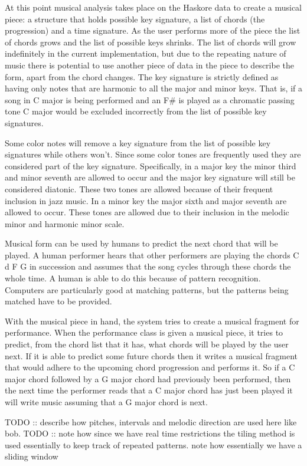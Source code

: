 \documentclass[12pt]{ucthesis}
\begin{document}
{At this point musical analysis takes place on the Haskore data to create a musical piece: a structure that holds possible key signature, a list of chords (the progression) and a time signature. As the user performs more of the piece the list of chords grows and the list of possible keys shrinks. The list of chords will grow indefinitely in the current implementation, but due to the repeating nature of music there is potential to use another piece of data in the piece to describe the form, apart from the chord changes. The key signature is strictly defined as having only notes that are harmonic to all the major and minor keys. That is, if a song in C major is being performed and an F\# is played as a chromatic passing tone C major would be excluded incorrectly from the list of possible key signatures. 

Some color notes will remove a key signature from the list of possible key signatures while others won't. Since some color tones are frequently used they are considered part of the key signature.  Specifically, in a major key the minor third and minor seventh are allowed to occur and the major key signature will still be considered diatonic. These two tones are allowed because of their frequent inclusion in jazz music. In a minor key the major sixth and major seventh are allowed to occur. These tones are allowed due to their inclusion in the melodic minor and harmonic minor scale. 

Musical form can be used by humans to predict the next chord that will be played. A human performer hears that other performers are playing the chords C d F G in succession and assumes that the song cycles through these chords the whole time. A human is able to do this because of pattern recognition. Computers are particularly good at matching patterns, but the patterns being matched have to be provided.

With the musical piece in hand, the system tries to create a musical fragment for performance. When the performance class is given a musical piece, it tries to predict, from the chord list that it has, what chords will be played by the user next. If it is able to predict some future chords then it writes a musical fragment that would adhere to the upcoming chord progression and performs it. So if a C major chord followed by a G major chord had previously been performed, then the next time the performer reads that a C major chord has just been played it will write music assuming that a G major chord is next. 

TODO :: describe how pitches, intervals and melodic direction are used here like bob.
TODO :: note how since we have real time restrictions the tiling method is used essentially to keep track of repeated patterns. note how essentially we have a sliding window

}
\end{document}
